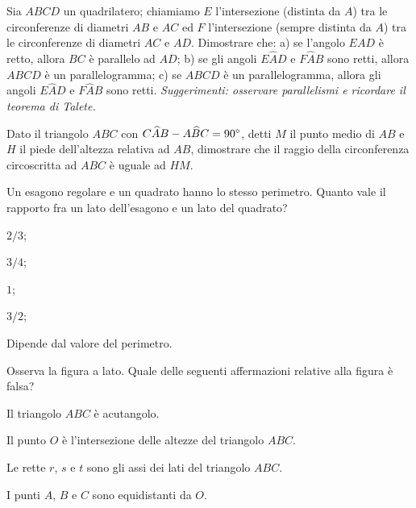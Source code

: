 \begin{esercizio}
\label{ese:5.56}
Sia $ABCD$ un quadrilatero; chiamiamo $E$ l'intersezione (distinta da $A$) tra le circonferenze di diametri $AB$ e $AC$ ed $F$ l'intersezione (sempre distinta da $A$) tra le circonferenze di diametri $AC$ e $AD$. Dimostrare che: a) se l'angolo $EAD$ è retto, allora $BC$ è parallelo ad $AD$; b) se gli angoli $E\widehat{A}D$ e $F\widehat{A}B$ sono retti, allora $ABCD$ è un parallelogramma; c) se $ABCD$ è un parallelogramma, allora gli angoli $E\widehat{A}D$ e $F\widehat{A}B$ sono retti. \emph{Suggerimenti: osservare parallelismi e ricordare il teorema di Talete.}
\end{esercizio}

\begin{esercizio}
\label{ese:5.57}
Dato il triangolo $ABC$ con $C\widehat{A}B-A\widehat{B}C=90{}^{\circ}$, detti $M$ il punto medio di $AB$ e $H$ il piede dell'altezza relativa ad $AB$, dimostrare che il raggio della circonferenza circoscritta ad $ABC$ è uguale ad $HM$.
\end{esercizio}

\begin{esercizio}
\label{ese:5.58}
Un esagono regolare e un quadrato hanno lo stesso perimetro. Quanto vale il rapporto fra un lato dell'esagono e un lato del quadrato?
\begin{multicols}{2}
\begin{enumeratea}
\item $2/3$;
\item $3/4$;
\item $1$;
\item $3/2$;
\item Dipende dal valore del perimetro.
\end{enumeratea}
\end{multicols}
\end{esercizio}

\noindent\begin{minipage}{0.7\textwidth}\parindent15pt
\begin{esercizio}
\label{ese:5.59}
Osserva la figura a lato. Quale delle seguenti affermazioni relative alla figura è falsa?
\begin{enumeratea}
\item Il triangolo $ABC$ è acutangolo.
\item Il punto $O$ è l'intersezione delle altezze del triangolo $ABC$.
\item Le rette $r$, $s$ e $t$ sono gli assi dei lati del triangolo $ABC$.
\item I punti $A$, $B$ e $C$ sono equidistanti da $O$.
\end{enumeratea}
\end{esercizio}
\end{minipage}\hfil
\begin{minipage}{0.3\textwidth}
	\centering
\end{minipage}\vspace{5pt}

